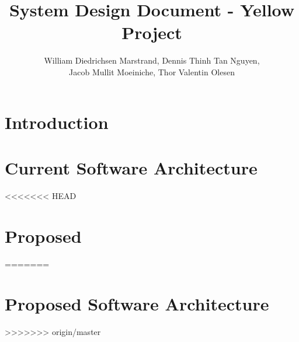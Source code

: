 \documentclass{article}
\title{System Design Document - Yellow Project}
\author{William Diedrichsen Marstrand, Dennis Thinh Tan Nguyen, 
\\Jacob Mullit Moeiniche, Thor Valentin Olesen}
\begin{document}
\maketitle

\section{Introduction}
	
	
\section{Current Software Architecture}
<<<<<<< HEAD

\section{Proposed}
	
=======
\section{Proposed Software Architecture}
	
>>>>>>> origin/master
	
\end{document}
